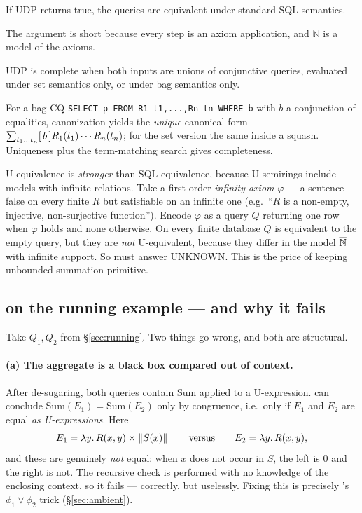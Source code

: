 \begin{theorem}
If \textsc{UDP} returns true, the queries are equivalent under standard SQL semantics.
\end{theorem}
The argument is short because every step is an axiom application, and $\mathbb{N}$ is a
model of the axioms.

\begin{theorem}
\textsc{UDP} is complete when both inputs are unions of conjunctive queries, evaluated
under set semantics only, or under bag semantics only.
\end{theorem}
For a bag CQ \lstinline|SELECT p FROM R1 t1,...,Rn tn WHERE b| with $b$ a conjunction of
equalities, canonization yields the \emph{unique} canonical form
$\sum_{t_1\ldots t_n}[\,b\,]R_1(t_1)\cdots R_n(t_n)$; for the set version the same inside a
squash. Uniqueness plus the term-matching search gives completeness.

\begin{remark}
U-equivalence is \emph{stronger} than SQL equivalence, because U-semirings include models
with infinite relations. Take a first-order \emph{infinity axiom} $\varphi$ --- a sentence
false on every finite $R$ but satisfiable on an infinite one (e.g.\ ``$R$ is a non-empty,
injective, non-surjective function''). Encode $\varphi$ as a query $Q$ returning one row
when $\varphi$ holds and none otherwise. On every finite database $Q$ is equivalent to the
empty query, but they are \emph{not} U-equivalent, because they differ in the model $\overline{\mathbb{N}}$
with infinite support. So \udp{} must answer UNKNOWN. This is the price of keeping
unbounded summation primitive.
\end{remark}

\subsection{\udp{} on the running example --- and why it fails}
\label{sec:udp-fails}

Take $Q_1,Q_2$ from \S\ref{sec:running}. Two things go wrong, and both are structural.

\paragraph{(a) The aggregate is a black box compared out of context.}
After de-sugaring, both queries contain $\mathrm{Sum}$ applied to a U-expression. \udp{}
can conclude $\mathrm{Sum}(E_1)=\mathrm{Sum}(E_2)$ only by congruence, i.e.\ only if
$E_1$ and $E_2$ are equal \emph{as U-expressions}. Here
\[
E_1 = \lambda y.\,R(x,y)\times\left\lVert S(x) \right\rVert \qquad\text{versus}\qquad E_2=\lambda y.\,R(x,y),
\]
and these are genuinely \emph{not} equal: when $x$ does not occur in $S$, the left is $0$
and the right is not. The recursive check is performed with no knowledge of the enclosing
context, so it fails --- correctly, but uselessly. Fixing this is precisely \QED{}'s
$\phi_1\vee\phi_2$ trick (\S\ref{sec:ambient}).

